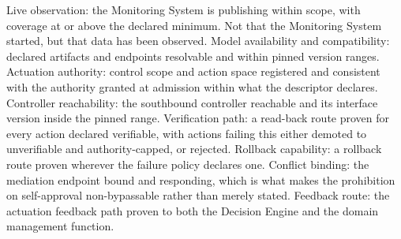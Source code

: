 Live observation: the Monitoring System is publishing within scope, with
coverage at or above the declared minimum. Not that the Monitoring
System started, but that data has been observed. Model availability and
compatibility: declared artifacts and endpoints resolvable and within
pinned version ranges. Actuation authority: control scope and action
space registered and consistent with the authority granted at admission
within what the descriptor declares. Controller reachability: the
southbound controller reachable and its interface version inside the
pinned range. Verification path: a read-back route proven for every
action declared verifiable, with actions failing this either demoted to
unverifiable and authority-capped, or rejected. Rollback capability: a
rollback route proven wherever the failure policy declares one. Conflict
binding: the mediation endpoint bound and responding, which is what
makes the prohibition on self-approval non-bypassable rather than merely
stated. Feedback route: the actuation feedback path proven to both the
Decision Engine and the domain management function.

